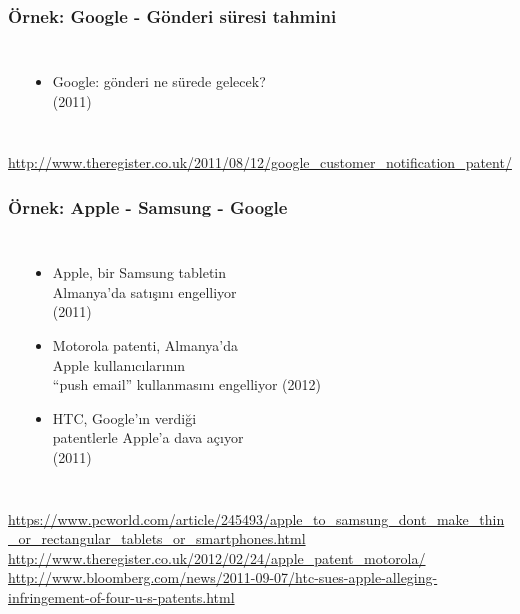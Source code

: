 \documentclass[dvipsnames]{beamer}
\theoremstyle{plain}
\begin{document}
\begin{frame}
  \frametitle{Örnek: Google - Gönderi süresi tahmini}

  \begin{columns}
    \begin{center}
    \end{center}

    \begin{itemize}
      \item Google: gönderi ne sürede gelecek?\\
        (2011)
    \end{itemize}
  \end{columns}

  \medskip
  \tiny{\url{http://www.theregister.co.uk/2011/08/12/google_customer_notification_patent/}}\\
\end{frame}

\begin{frame}
  \frametitle{Örnek: Apple - Samsung - Google}

  \begin{columns}
    \begin{center}
    \end{center}

    \begin{itemize}
      \item Apple, bir Samsung tabletin\\
        Almanya'da satışını engelliyor\\
        (2011)
      \item Motorola patenti, Almanya'da\\
        Apple kullanıcılarının\\
        ``push email'' kullanmasını engelliyor (2012)
      \item HTC, Google'ın verdiği\\
        patentlerle Apple'a dava açıyor\\
        (2011)
    \end{itemize}
  \end{columns}

  \medskip
  \tiny{\url{https://www.pcworld.com/article/245493/apple_to_samsung_dont_make_thin_or_rectangular_tablets_or_smartphones.html}}\\
  \tiny{\url{http://www.theregister.co.uk/2012/02/24/apple_patent_motorola/}}\\
  \tiny{\url{http://www.bloomberg.com/news/2011-09-07/htc-sues-apple-alleging-infringement-of-four-u-s-patents.html}}\\
\end{frame}
\end{document}
